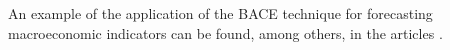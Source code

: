 An example of the application of the BACE technique for forecasting
macroeconomic indicators can be found, among others, in the articles
\cite{vanDijk2004Forecasting,BialowolskiKuszewskiWitkowski2015Empirica,
  AlbisMapa2014MPRA55902}.

